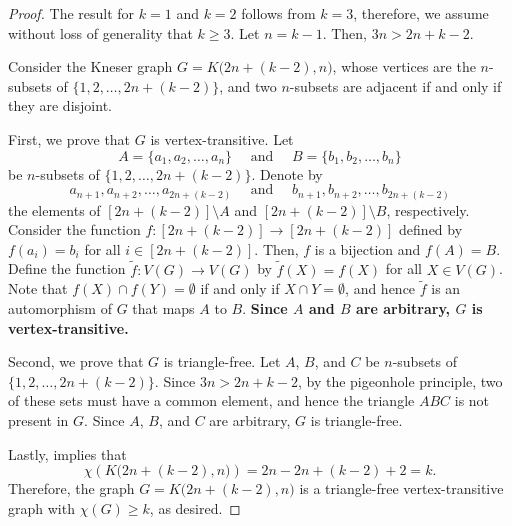 \begin{proof}
    The result for \(k = 1\) and \(k = 2\) follows from \(k = 3\),
    therefore, we assume without loss of generality that \(k \geq 3\).
    Let \(n = k - 1\). Then, \(3n > 2n + k - 2\).

    Consider the Kneser graph \(G = K\big(2n + (k-2), n\big)\),
    whose vertices are the \(n\)-subsets of \(\{1, 2, \dots, 2n + (k - 2)\}\),
    and two \(n\)-subsets are adjacent if and only if they are disjoint.

    First, we prove that \(G\) is vertex-transitive.
    Let
    \begin{equation}
        A = \{a_1, a_2, \dots, a_n\}
        \quad \text{ and } \quad
        B = \{b_1, b_2, \dots, b_n\}
    \end{equation}
    be \(n\)-subsets of \(\{1, 2, \dots, 2n + (k - 2)\}\).
    Denote by 
    \begin{equation}
        a_{n+1}, a_{n+2}, \dots, a_{2n + (k - 2)}
        \quad \text{ and } \quad
        b_{n+1}, b_{n+2}, \dots, b_{2n + (k - 2)}
    \end{equation}
    the elements of \([2n + (k - 2)] \setminus A\) and \([2n + (k - 2)] \setminus B\), respectively.
    Consider the function \(f \colon [2n + (k - 2)] \to [2n + (k - 2)]\) defined by \(f(a_i) = b_i\) for all \(i \in [2n + (k - 2)]\).
    Then, \(f\) is a bijection and \(f(A) = B\).
    Define the function \(\tilde{f} \colon V(G) \to V(G)\) by \(\tilde{f}(X) = f(X)\) for all \(X \in V(G)\).
    Note that \(f(X) \cap f(Y) = \emptyset\) if and only if \(X \cap Y = \emptyset\),
    and hence \(\tilde{f}\) is an automorphism of \(G\) that maps \(A\) to \(B\).
    \textbf{Since \(A\) and \(B\) are arbitrary, \(G\) is vertex-transitive.}

    Second, we prove that \(G\) is triangle-free.
    Let \(A\), \(B\), and \(C\) be \(n\)-subsets of \(\{1, 2, \dots, 2n + (k - 2)\}\).
    Since \(3n > 2n + k - 2\), by the pigeonhole principle,
    two of these sets must have a common element,
    and hence the triangle \(ABC\) is not present in \(G\).
    Since \(A\), \(B\), and \(C\) are arbitrary, \(G\) is triangle-free.

    Lastly,  implies that
    \begin{equation}
        \chi\left(K\big(2n + (k-2), n\big)\right) = 2n - 2n + (k - 2) + 2 = k.
    \end{equation}
    Therefore, the graph \(G = K\big(2n + (k-2), n\big)\) is a triangle-free vertex-transitive graph with \(\chi(G) \geq k\), as desired.
\end{proof}

